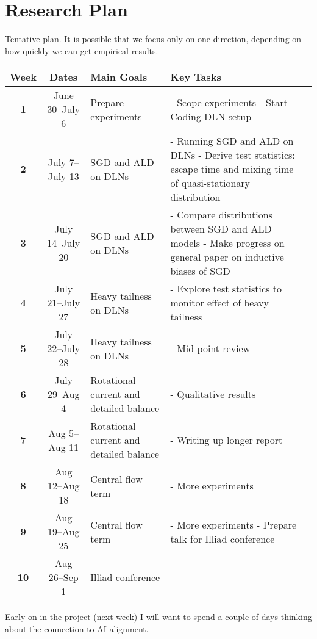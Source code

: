\documentclass[11pt]{article}
\begin{document}
\section*{Research Plan}
Tentative plan. It is possible that we focus only on one direction, depending on how quickly we can get empirical results.
\begin{longtable}{>{\bfseries}c | c | m{4cm} | m{5cm} | m{4cm}}
\toprule
Week & Dates & Main Goals & Key Tasks \\
\midrule
1 & June 30--July 6 & Prepare experiments & 
- Scope experiments \newline
- Start Coding DLN setup\\
\midrule
2 & July 7--July 13 & SGD and ALD on DLNs & 
- Running SGD and ALD on DLNs \newline
- Derive test statistics: escape time and mixing time of quasi-stationary distribution \\
\midrule
3 & July 14--July 20 & SGD and ALD on DLNs & 
- Compare distributions between SGD and ALD models \newline
- Make progress on general paper on inductive biases of SGD\\
\midrule
4 & July 21--July 27 & Heavy tailness on DLNs & 
- Explore test statistics to monitor effect of heavy tailness\\
\midrule
5 & July 22--July 28 & Heavy tailness on DLNs & 
- Mid-point review \\
\midrule
6 & July 29--Aug 4 & Rotational current and detailed balance & 
- Qualitative results\\
\midrule
7 & Aug 5--Aug 11 & Rotational current and detailed balance & 
- Writing up longer report \\
\midrule
8 & Aug 12--Aug 18 & Central flow term & 
- More experiments \\
\midrule
9 & Aug 19--Aug 25 & Central flow term & 
- More experiments \newline
- Prepare talk for Illiad conference \\
\midrule
10 & Aug 26--Sep 1 & 
Illiad conference \\
\bottomrule
\end{longtable}
Early on in the project (next week) I will want to spend a couple of days thinking about the connection to AI alignment.
\end{document}
